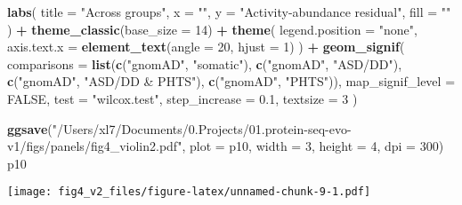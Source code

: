 \documentclass[
]{article}
\newenvironment{Shaded}{\begin{snugshade}}{\end{snugshade}}
\newcommand{\AttributeTok}[1]{\textcolor[rgb]{0.13,0.29,0.53}{#1}}
\newcommand{\CommentTok}[1]{\textcolor[rgb]{0.56,0.35,0.01}{\textit{#1}}}
\newcommand{\ConstantTok}[1]{\textcolor[rgb]{0.56,0.35,0.01}{#1}}
\newcommand{\DecValTok}[1]{\textcolor[rgb]{0.00,0.00,0.81}{#1}}
\newcommand{\FloatTok}[1]{\textcolor[rgb]{0.00,0.00,0.81}{#1}}
\newcommand{\FunctionTok}[1]{\textcolor[rgb]{0.13,0.29,0.53}{\textbf{#1}}}
\newcommand{\NormalTok}[1]{#1}
\newcommand{\SpecialCharTok}[1]{\textcolor[rgb]{0.81,0.36,0.00}{\textbf{#1}}}
\newcommand{\StringTok}[1]{\textcolor[rgb]{0.31,0.60,0.02}{#1}}
\begin{document}
\begin{Shaded}
\begin{Highlighting}[]
  \FunctionTok{labs}\NormalTok{(}
    \AttributeTok{title =} \StringTok{"Across groups"}\NormalTok{,}
    \AttributeTok{x =} \StringTok{""}\NormalTok{,}
    \AttributeTok{y =} \StringTok{"Activity{-}abundance residual"}\NormalTok{,}
    \AttributeTok{fill =} \StringTok{""}
\NormalTok{  ) }\SpecialCharTok{+}
  \FunctionTok{theme\_classic}\NormalTok{(}\AttributeTok{base\_size =} \DecValTok{14}\NormalTok{) }\SpecialCharTok{+}
  \FunctionTok{theme}\NormalTok{(}
    \AttributeTok{legend.position =} \StringTok{"none"}\NormalTok{,}
    \AttributeTok{axis.text.x =} \FunctionTok{element\_text}\NormalTok{(}\AttributeTok{angle =} \DecValTok{20}\NormalTok{, }\AttributeTok{hjust =} \DecValTok{1}\NormalTok{) }
\NormalTok{  ) }\SpecialCharTok{+}
    \FunctionTok{geom\_signif}\NormalTok{(}
    \AttributeTok{comparisons =} \FunctionTok{list}\NormalTok{(}\FunctionTok{c}\NormalTok{(}\StringTok{"gnomAD"}\NormalTok{, }\StringTok{"somatic"}\NormalTok{), }
                       \FunctionTok{c}\NormalTok{(}\StringTok{"gnomAD"}\NormalTok{, }\StringTok{"ASD/DD"}\NormalTok{), }
                       \FunctionTok{c}\NormalTok{(}\StringTok{"gnomAD"}\NormalTok{, }\StringTok{"ASD/DD \& PHTS"}\NormalTok{),}
                       \FunctionTok{c}\NormalTok{(}\StringTok{"gnomAD"}\NormalTok{, }\StringTok{"PHTS"}\NormalTok{)),}
    \AttributeTok{map\_signif\_level =} \ConstantTok{FALSE}\NormalTok{,}
    \AttributeTok{test =} \StringTok{"wilcox.test"}\NormalTok{,}
    \AttributeTok{step\_increase =} \FloatTok{0.1}\NormalTok{,}
    \AttributeTok{textsize =} \DecValTok{3}
\NormalTok{  ) }

\FunctionTok{ggsave}\NormalTok{(}\StringTok{"/Users/xl7/Documents/0.Projects/01.protein{-}seq{-}evo{-}v1/figs/panels/fig4\_violin2.pdf"}\NormalTok{, }
       \AttributeTok{plot =}\NormalTok{ p10, }\AttributeTok{width =} \DecValTok{3}\NormalTok{, }\AttributeTok{height =} \DecValTok{4}\NormalTok{, }\AttributeTok{dpi =} \DecValTok{300}\NormalTok{)}
\NormalTok{p10}
\end{Highlighting}
\end{Shaded}

\texttt{[image: fig4\_v2\_files/figure-latex/unnamed-chunk-9-1.pdf]}

\begin{Shaded}
\end{Shaded}
\end{document}
